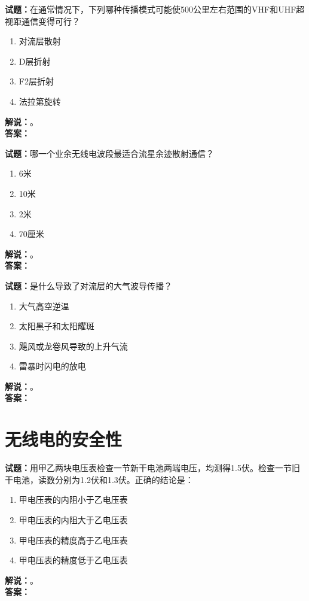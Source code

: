 \documentclass{ctexbook}
\begin{document}
\noindent\textbf{试题：}在通常情况下，下列哪种传播模式可能使500公里左右范围的VHF和UHF超视距通信变得可行？
\begin{enumerate}[leftmargin=3em]
  \item 对流层散射
  \item D层折射
  \item F2层折射
  \item 法拉第旋转
\end{enumerate}
\noindent\textbf{解说：}\textbf{}。\\\noindent\textbf{答案：}

\bigskip

\noindent\textbf{试题：}哪一个业余无线电波段最适合流星余迹散射通信？
\begin{enumerate}[leftmargin=3em]
  \item 6米
  \item 10米
  \item 2米
  \item 70厘米
\end{enumerate}
\noindent\textbf{解说：}\textbf{}。\\\noindent\textbf{答案：}

\bigskip

\noindent\textbf{试题：}是什么导致了对流层的大气波导传播？
\begin{enumerate}[leftmargin=3em]
  \item 大气高空逆温
  \item 太阳黑子和太阳耀斑
  \item 飓风或龙卷风导致的上升气流
  \item 雷暴时闪电的放电
\end{enumerate}
\noindent\textbf{解说：}\textbf{}。\\\noindent\textbf{答案：}

\bigskip

\chapter{无线电的安全性}

\newpage

\noindent\textbf{试题：}用甲乙两块电压表检查一节新干电池两端电压，均测得1.5伏。检查一节旧干电池，读数分别为1.2伏和1.3伏。正确的结论是：
\begin{enumerate}[leftmargin=3em]
  \item 甲电压表的内阻小于乙电压表
  \item 甲电压表的内阻大于乙电压表
  \item 甲电压表的精度高于乙电压表
  \item 甲电压表的精度低于乙电压表
\end{enumerate}
\noindent\textbf{解说：}\textbf{}。\\\noindent\textbf{答案：}
\end{document}
